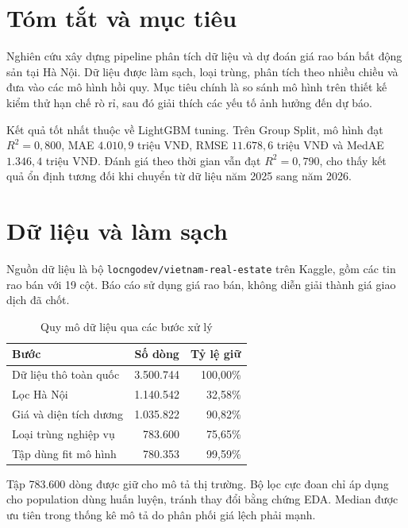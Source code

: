 \documentclass[11pt,a4paper]{article}
\begin{document}
\section{Tóm tắt và mục tiêu}
Nghiên cứu xây dựng pipeline phân tích dữ liệu và dự đoán giá rao bán bất động sản tại Hà Nội. Dữ liệu được làm sạch, loại trùng, phân tích theo nhiều chiều và đưa vào các mô hình hồi quy. Mục tiêu chính là so sánh mô hình trên thiết kế kiểm thử hạn chế rò rỉ, sau đó giải thích các yếu tố ảnh hưởng đến dự báo.

Kết quả tốt nhất thuộc về LightGBM tuning. Trên Group Split, mô hình đạt $R^2=0{,}800$, MAE $4.010{,}9$ triệu VNĐ, RMSE $11.678{,}6$ triệu VNĐ và MedAE $1.346{,}4$ triệu VNĐ. Đánh giá theo thời gian vẫn đạt $R^2=0{,}790$, cho thấy kết quả ổn định tương đối khi chuyển từ dữ liệu năm 2025 sang năm 2026.

\section{Dữ liệu và làm sạch}
Nguồn dữ liệu là bộ \texttt{locngodev/vietnam-real-estate} trên Kaggle, gồm các tin rao bán với 19 cột. Báo cáo sử dụng giá rao bán, không diễn giải thành giá giao dịch đã chốt.

\begin{table}[H]\centering\small
\caption{Quy mô dữ liệu qua các bước xử lý}\begin{tabular}{lrr}\toprule
Bước & Số dòng & Tỷ lệ giữ\\\midrule
Dữ liệu thô toàn quốc & 3.500.744 & 100,00\%\\
Lọc Hà Nội & 1.140.542 & 32,58\%\\
Giá và diện tích dương & 1.035.822 & 90,82\%\\
Loại trùng nghiệp vụ & 783.600 & 75,65\%\\
Tập dùng fit mô hình & 780.353 & 99,59\%\\\bottomrule
\end{tabular}\end{table}

Tập 783.600 dòng được giữ cho mô tả thị trường. Bộ lọc cực đoan chỉ áp dụng cho population dùng huấn luyện, tránh thay đổi bằng chứng EDA. Median được ưu tiên trong thống kê mô tả do phân phối giá lệch phải mạnh.
\end{document}

